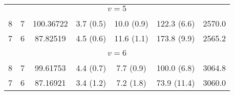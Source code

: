 \begin{table*}[htp]
\begin{tabular}{ccccccc}
\multicolumn{7}{c}{$v = 5$} \\
\vspace{-0.75em}\\
 8 & 7 & 100.36722 & 3.7 (0.5) & 10.0 (0.9) & 122.3 (6.6) & 2570.0 \\
 7 & 6 & 87.82519 & 4.5 (0.6) & 11.6 (1.1) & 173.8 (9.9) & 2565.2 \\
&\vspace{-0.75em}\\
\multicolumn{7}{c}{$v = 6$} \\
\vspace{-0.75em}\\
 8 & 7 & 99.61753 & 4.4 (0.7) & 7.7 (0.9) & 100.0 (6.8) & 3064.8 \\
 7 & 6 & 87.16921 & 3.4 (1.2) & 7.2 (1.8) & 73.9 (11.4) & 3060.0 \\
\hline
\end{tabular}

\par 
\end{table*}
